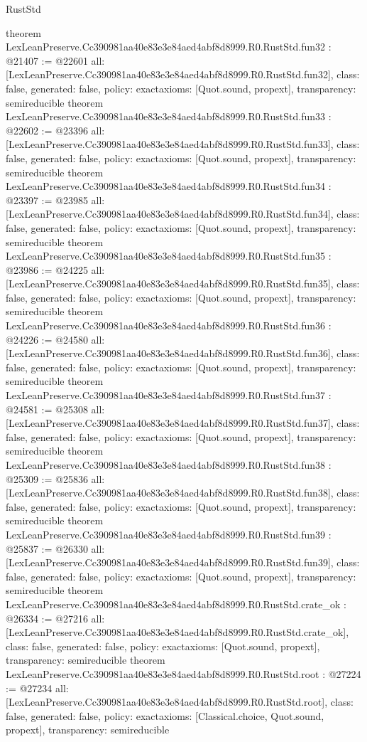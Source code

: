 \begin{lexlean}{RustStd}
\begin{coremodule}
{}
theorem LexLeanPreserve.Cc390981aa40e83e3e84aed4abf8d8999.R0.RustStd.fun32 : @21407 := @22601 {
  all: [LexLeanPreserve.Cc390981aa40e83e3e84aed4abf8d8999.R0.RustStd.fun32],
  class: false,
  generated: false,
  policy: exact{axioms: [Quot.sound, propext]},
  transparency: semireducible
}
theorem LexLeanPreserve.Cc390981aa40e83e3e84aed4abf8d8999.R0.RustStd.fun33 : @22602 := @23396 {
  all: [LexLeanPreserve.Cc390981aa40e83e3e84aed4abf8d8999.R0.RustStd.fun33],
  class: false,
  generated: false,
  policy: exact{axioms: [Quot.sound, propext]},
  transparency: semireducible
}
theorem LexLeanPreserve.Cc390981aa40e83e3e84aed4abf8d8999.R0.RustStd.fun34 : @23397 := @23985 {
  all: [LexLeanPreserve.Cc390981aa40e83e3e84aed4abf8d8999.R0.RustStd.fun34],
  class: false,
  generated: false,
  policy: exact{axioms: [Quot.sound, propext]},
  transparency: semireducible
}
theorem LexLeanPreserve.Cc390981aa40e83e3e84aed4abf8d8999.R0.RustStd.fun35 : @23986 := @24225 {
  all: [LexLeanPreserve.Cc390981aa40e83e3e84aed4abf8d8999.R0.RustStd.fun35],
  class: false,
  generated: false,
  policy: exact{axioms: [Quot.sound, propext]},
  transparency: semireducible
}
theorem LexLeanPreserve.Cc390981aa40e83e3e84aed4abf8d8999.R0.RustStd.fun36 : @24226 := @24580 {
  all: [LexLeanPreserve.Cc390981aa40e83e3e84aed4abf8d8999.R0.RustStd.fun36],
  class: false,
  generated: false,
  policy: exact{axioms: [Quot.sound, propext]},
  transparency: semireducible
}
theorem LexLeanPreserve.Cc390981aa40e83e3e84aed4abf8d8999.R0.RustStd.fun37 : @24581 := @25308 {
  all: [LexLeanPreserve.Cc390981aa40e83e3e84aed4abf8d8999.R0.RustStd.fun37],
  class: false,
  generated: false,
  policy: exact{axioms: [Quot.sound, propext]},
  transparency: semireducible
}
theorem LexLeanPreserve.Cc390981aa40e83e3e84aed4abf8d8999.R0.RustStd.fun38 : @25309 := @25836 {
  all: [LexLeanPreserve.Cc390981aa40e83e3e84aed4abf8d8999.R0.RustStd.fun38],
  class: false,
  generated: false,
  policy: exact{axioms: [Quot.sound, propext]},
  transparency: semireducible
}
theorem LexLeanPreserve.Cc390981aa40e83e3e84aed4abf8d8999.R0.RustStd.fun39 : @25837 := @26330 {
  all: [LexLeanPreserve.Cc390981aa40e83e3e84aed4abf8d8999.R0.RustStd.fun39],
  class: false,
  generated: false,
  policy: exact{axioms: [Quot.sound, propext]},
  transparency: semireducible
}
theorem LexLeanPreserve.Cc390981aa40e83e3e84aed4abf8d8999.R0.RustStd.crate_ok : @26334 := @27216 {
  all: [LexLeanPreserve.Cc390981aa40e83e3e84aed4abf8d8999.R0.RustStd.crate_ok],
  class: false,
  generated: false,
  policy: exact{axioms: [Quot.sound, propext]},
  transparency: semireducible
}
theorem LexLeanPreserve.Cc390981aa40e83e3e84aed4abf8d8999.R0.RustStd.root : @27224 := @27234 {
  all: [LexLeanPreserve.Cc390981aa40e83e3e84aed4abf8d8999.R0.RustStd.root],
  class: false,
  generated: false,
  policy: exact{axioms: [Classical.choice, Quot.sound, propext]},
  transparency: semireducible
}


\end{coremodule}
\end{lexlean}
